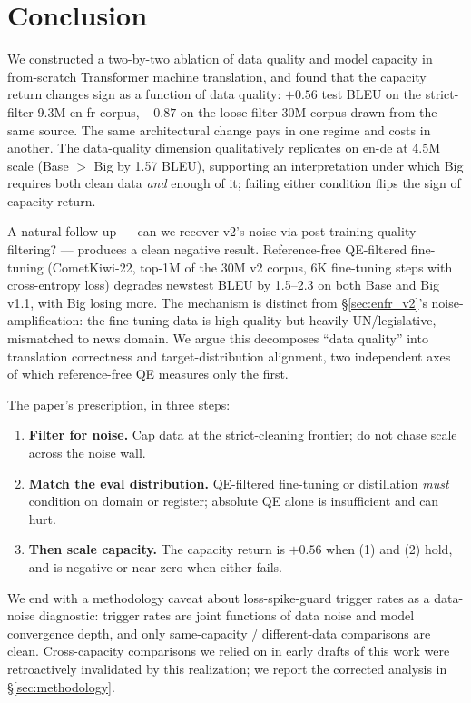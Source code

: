 \section{Conclusion}
\label{sec:conclusion}

We constructed a two-by-two ablation of data quality and model capacity in from-scratch Transformer machine translation, and found that the capacity return changes sign as a function of data quality: $+0.56$ test BLEU on the strict-filter 9.3M en-fr corpus, $-0.87$ on the loose-filter 30M corpus drawn from the same source. The same architectural change pays in one regime and costs in another. The data-quality dimension qualitatively replicates on en-de at 4.5M scale (Base $>$ Big by 1.57 BLEU), supporting an interpretation under which Big requires both clean data \emph{and} enough of it; failing either condition flips the sign of capacity return.

A natural follow-up --- can we recover v2's noise via post-training quality filtering? --- produces a clean negative result. Reference-free QE-filtered fine-tuning (CometKiwi-22, top-1M of the 30M v2 corpus, 6K fine-tuning steps with cross-entropy loss) degrades newstest BLEU by 1.5--2.3 on both Base and Big v1.1, with Big losing more. The mechanism is distinct from \S\ref{sec:enfr_v2}'s noise-amplification: the fine-tuning data is high-quality but heavily UN/legislative, mismatched to news domain. We argue this decomposes ``data quality'' into translation correctness and target-distribution alignment, two independent axes of which reference-free QE measures only the first.

The paper's prescription, in three steps:
\begin{enumerate}
\item \textbf{Filter for noise.} Cap data at the strict-cleaning frontier; do not chase scale across the noise wall.
\item \textbf{Match the eval distribution.} QE-filtered fine-tuning or distillation \emph{must} condition on domain or register; absolute QE alone is insufficient and can hurt.
\item \textbf{Then scale capacity.} The capacity return is $+0.56$ when (1) and (2) hold, and is negative or near-zero when either fails.
\end{enumerate}

We end with a methodology caveat about loss-spike-guard trigger rates as a data-noise diagnostic: trigger rates are joint functions of data noise and model convergence depth, and only same-capacity / different-data comparisons are clean. Cross-capacity comparisons we relied on in early drafts of this work were retroactively invalidated by this realization; we report the corrected analysis in §\ref{sec:methodology}.

